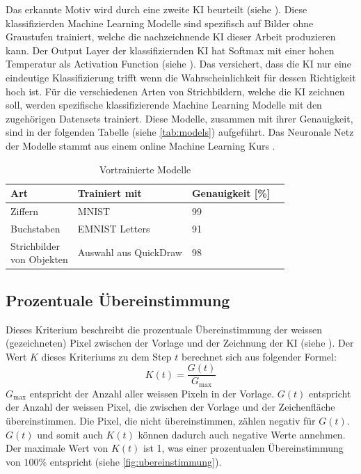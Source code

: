 Das erkannte Motiv wird durch eine zweite KI beurteilt (siehe
). Diese klassifizierden Machine Learning Modelle sind
spezifisch auf Bilder ohne Graustufen trainiert, welche die nachzeichnende KI
dieser Arbeit produzieren kann. Der Output Layer der klassifiziernden KI hat
Softmax mit einer hohen Temperatur als Activation Function (siehe
). Das versichert, dass die KI nur eine eindeutige
Klassifizierung trifft wenn die Wahrscheinlichkeit für dessen Richtigkeit hoch
ist. Für die verschiedenen Arten von Strichbildern, welche die KI zeichnen soll,
werden spezifische klassifizierende Machine Learning Modelle mit den zugehörigen
Datensets trainiert. Diese Modelle, zusammen mit ihrer Genauigkeit, sind in der
folgenden Tabelle (siehe \autoref{tab:models}) aufgeführt. Das Neuronale Netz
der Modelle stammt aus einem online Machine Learning Kurs \cite{wang_deep_2021}. %

\begin{table}[!ht]
 \centering  
 \begin{tabular}{|l|l|l|l|}
 \hline
     Art & Trainiert mit & Genauigkeit [\%]\\ \hline
     Ziffern & MNIST & 99\\ \hline
     Buchstaben  & EMNIST Letters & 91\\ \hline
     \makecell{Strichbilder\\von Objekten}  & Auswahl aus QuickDraw & 98\\ \hline
 \end{tabular}
 \caption{Vortrainierte Modelle}\label{tab:models}
\end{table}
 
\subsection{Prozentuale Übereinstimmung}\label{sub:m_eval_proc}
Dieses Kriterium beschreibt die prozentuale Übereinstimmung der weissen
(gezeichneten) Pixel zwischen der Vorlage und der Zeichnung der KI (siehe
). Der Wert $K$ dieses Kriteriums zu dem Step $t$
berechnet sich aus folgender Formel:
\[ K(t) = \frac{G(t)}{G_{\max}} \] $G_{\max}$ entspricht der Anzahl aller
weissen Pixeln in der Vorlage. $G(t)$ entspricht der Anzahl der weissen Pixel,
die zwischen der Vorlage und der Zeichenfläche übereinstimmen. Die Pixel, die
nicht übereinstimmen, zählen negativ für $G(t)$. $G(t)$ und somit auch $K(t)$
können dadurch auch negative Werte annehmen. Der maximale Wert von $K(t)$ ist 1,
was einer prozentualen Übereinstimmung von $100\%$ entspricht (siehe
\autoref{fig:ubereinstimmung}).
 
